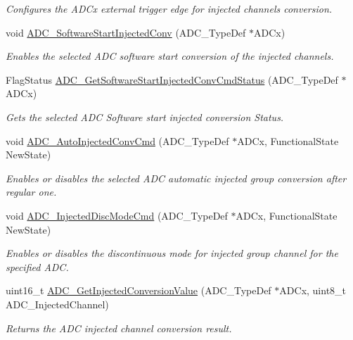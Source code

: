 \begin{DoxyCompactItemize}
\begin{DoxyCompactList}\small\item\em Configures the A\-D\-Cx external trigger edge for injected channels conversion. \end{DoxyCompactList}\item 
void \hyperlink{group___a_d_c_ga79b2f6c3c77925b35495f2db228895de}{A\-D\-C\-\_\-\-Software\-Start\-Injected\-Conv} (A\-D\-C\-\_\-\-Type\-Def $\ast$A\-D\-Cx)
\begin{DoxyCompactList}\small\item\em Enables the selected A\-D\-C software start conversion of the injected channels. \end{DoxyCompactList}\item 
Flag\-Status \hyperlink{group___a_d_c_ga8765f8835b8cfed13dce3d8d71767dcc}{A\-D\-C\-\_\-\-Get\-Software\-Start\-Injected\-Conv\-Cmd\-Status} (A\-D\-C\-\_\-\-Type\-Def $\ast$A\-D\-Cx)
\begin{DoxyCompactList}\small\item\em Gets the selected A\-D\-C Software start injected conversion Status. \end{DoxyCompactList}\item 
void \hyperlink{group___a_d_c_ga1ff9c3b8e4bbdd2addfd227f1a506a66}{A\-D\-C\-\_\-\-Auto\-Injected\-Conv\-Cmd} (A\-D\-C\-\_\-\-Type\-Def $\ast$A\-D\-Cx, Functional\-State New\-State)
\begin{DoxyCompactList}\small\item\em Enables or disables the selected A\-D\-C automatic injected group conversion after regular one. \end{DoxyCompactList}\item 
void \hyperlink{group___a_d_c_ga0b583b94183fa4ff287177b9ee808092}{A\-D\-C\-\_\-\-Injected\-Disc\-Mode\-Cmd} (A\-D\-C\-\_\-\-Type\-Def $\ast$A\-D\-Cx, Functional\-State New\-State)
\begin{DoxyCompactList}\small\item\em Enables or disables the discontinuous mode for injected group channel for the specified A\-D\-C. \end{DoxyCompactList}\item 
uint16\-\_\-t \hyperlink{group___a_d_c_ga1dea5ed24571a2e0ce4cbd41c9c1ec46}{A\-D\-C\-\_\-\-Get\-Injected\-Conversion\-Value} (A\-D\-C\-\_\-\-Type\-Def $\ast$A\-D\-Cx, uint8\-\_\-t A\-D\-C\-\_\-\-Injected\-Channel)
\begin{DoxyCompactList}\small\item\em Returns the A\-D\-C injected channel conversion result. \end{DoxyCompactList}\item 

\end{DoxyCompactItemize}

